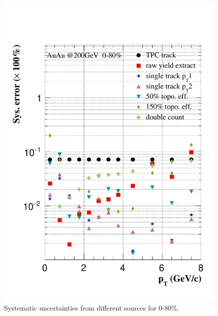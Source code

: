 \begin{figure}[htbp]
\begin{minipage}[htbp]{0.47\linewidth}
\includegraphics[width=1.0\textwidth,angle=0]{figure/Run14_D0HFT/sysErr_0_80.pdf} 
\caption{ Systematic uncertainties from different sources for 0-80\%. \label{sysErr_0_80}}
\end{minipage}
\end{figure}



